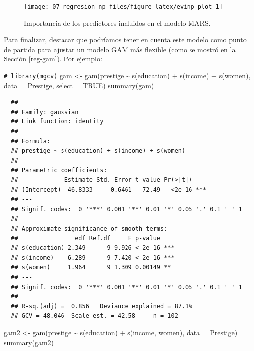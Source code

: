 \documentclass[
]{book}
\newenvironment{Shaded}{\begin{snugshade}}{\end{snugshade}}
\newcommand{\AttributeTok}[1]{\textcolor[rgb]{0.77,0.63,0.00}{#1}}
\newcommand{\CommentTok}[1]{\textcolor[rgb]{0.56,0.35,0.01}{\textit{#1}}}
\newcommand{\ConstantTok}[1]{\textcolor[rgb]{0.00,0.00,0.00}{#1}}
\newcommand{\FunctionTok}[1]{\textcolor[rgb]{0.00,0.00,0.00}{#1}}
\newcommand{\NormalTok}[1]{#1}
\newcommand{\OtherTok}[1]{\textcolor[rgb]{0.56,0.35,0.01}{#1}}
\newcommand{\SpecialCharTok}[1]{\textcolor[rgb]{0.00,0.00,0.00}{#1}}
\theoremstyle{break}
\theoremstyle{nonumberplain}
\renewcommand{\CommentTok}[1]{\textcolor[rgb]{0.41,0.41,0.41}{\texttt{#1}}}
\begin{document}
\begin{figure}[!htb]

{\centering \texttt{[image: 07-regresion\_np\_files/figure-latex/evimp-plot-1]} 

}

\caption{Importancia de los predictores incluidos en el modelo MARS.}\label{fig:evimp-plot}
\end{figure}

Para finalizar, destacar que podríamos tener en cuenta este modelo como punto de partida para ajustar un modelo GAM más flexible (como se mostró en la Sección \ref{reg-gam}).
Por ejemplo:



\begin{Shaded}
\begin{Highlighting}[]
\CommentTok{\# library(mgcv)}
\NormalTok{gam }\OtherTok{\textless{}{-}} \FunctionTok{gam}\NormalTok{(prestige }\SpecialCharTok{\textasciitilde{}} \FunctionTok{s}\NormalTok{(education) }\SpecialCharTok{+} \FunctionTok{s}\NormalTok{(income) }\SpecialCharTok{+} \FunctionTok{s}\NormalTok{(women), }\AttributeTok{data =}\NormalTok{ Prestige, }\AttributeTok{select =} \ConstantTok{TRUE}\NormalTok{)}
\FunctionTok{summary}\NormalTok{(gam)}
\end{Highlighting}
\end{Shaded}

\begin{verbatim}
  ## 
  ## Family: gaussian 
  ## Link function: identity 
  ## 
  ## Formula:
  ## prestige ~ s(education) + s(income) + s(women)
  ## 
  ## Parametric coefficients:
  ##             Estimate Std. Error t value Pr(>|t|)    
  ## (Intercept)  46.8333     0.6461   72.49   <2e-16 ***
  ## ---
  ## Signif. codes:  0 '***' 0.001 '**' 0.01 '*' 0.05 '.' 0.1 ' ' 1
  ## 
  ## Approximate significance of smooth terms:
  ##                edf Ref.df     F p-value    
  ## s(education) 2.349      9 9.926 < 2e-16 ***
  ## s(income)    6.289      9 7.420 < 2e-16 ***
  ## s(women)     1.964      9 1.309 0.00149 ** 
  ## ---
  ## Signif. codes:  0 '***' 0.001 '**' 0.01 '*' 0.05 '.' 0.1 ' ' 1
  ## 
  ## R-sq.(adj) =  0.856   Deviance explained = 87.1%
  ## GCV = 48.046  Scale est. = 42.58     n = 102
\end{verbatim}

\begin{Shaded}
\begin{Highlighting}[]
\NormalTok{gam2 }\OtherTok{\textless{}{-}} \FunctionTok{gam}\NormalTok{(prestige }\SpecialCharTok{\textasciitilde{}} \FunctionTok{s}\NormalTok{(education) }\SpecialCharTok{+} \FunctionTok{s}\NormalTok{(income, women), }\AttributeTok{data =}\NormalTok{ Prestige)}
\FunctionTok{summary}\NormalTok{(gam2)}
\end{Highlighting}
\end{Shaded}
\end{document}
